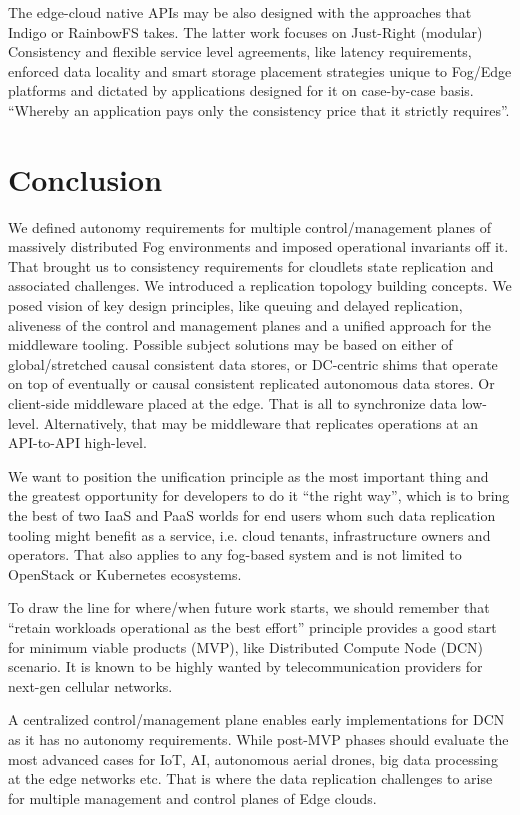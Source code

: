 \documentclass[conference]{IEEEtran}
\begin{document}
The edge-cloud native APIs may be also designed with the approaches that
Indigo\cite{b10} or RainbowFS\cite{b7} takes. The latter work focuses on
Just-Right (modular) Consistency and flexible service level agreements, like
latency requirements, enforced data locality and smart storage placement
strategies unique to Fog/Edge platforms and dictated by applications designed
for it on case-by-case basis. ``Whereby an application pays only the
consistency price that it strictly requires''\cite{b7}.

\section{Conclusion}
We defined autonomy requirements for multiple control/management planes of
massively distributed Fog environments and imposed operational invariants off
it. That brought us to consistency requirements for cloudlets state replication
and associated challenges. We introduced a replication topology building
concepts. We posed vision of key design principles, like queuing and delayed
replication, aliveness of the control and management planes and a unified
approach for the middleware tooling. Possible subject solutions may be based on
either of global/stretched causal consistent data stores, or DC-centric shims
that operate on top of eventually or causal consistent replicated autonomous
data stores. Or client-side middleware placed at the edge. That is all to
synchronize data low-level. Alternatively, that may be middleware that
replicates operations at an API-to-API high-level.

We want to position the unification principle as the most important thing and
the greatest opportunity for developers to do it ``the right way'', which is to
bring the best of two IaaS and PaaS worlds for end users whom such data
replication tooling might benefit as a service, i.e. cloud tenants,
infrastructure owners and operators. That also applies to any fog-based system
and is not limited to OpenStack or Kubernetes ecosystems.

To draw the line for where/when future work starts, we should remember
that ``retain workloads operational as the best effort'' principle provides a
good start for minimum viable products (MVP), like Distributed Compute Node
(DCN) scenario. It is known to be highly wanted by telecommunication providers
for next-gen cellular networks.

\newpage
A centralized control/management plane enables early implementations for DCN as
it has no autonomy requirements. While post-MVP phases should evaluate the most
advanced cases for IoT, AI, autonomous aerial drones, big data processing at
the edge networks etc. That is where the data replication challenges to arise
for multiple management and control planes of Edge clouds.
\end{document}
